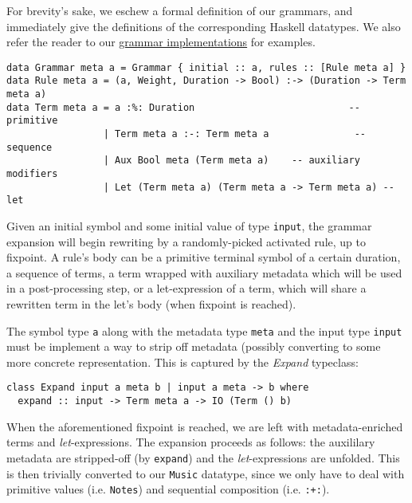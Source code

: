 \documentclass[11pt,a4paper]{article}
\newcommand{\icode}[1]{\texttt{#1}}
\begin{document}
For brevity's sake, we eschew a formal definition of our grammars, and immediately give the definitions of the corresponding Haskell datatypes. We also refer the reader to our \href{https://github.com/omelkonian/AlgoRhythm/blob/master/AlgoRhythm/src/Grammar}{grammar implementations} for examples.
\begin{verbatim}
data Grammar meta a = Grammar { initial :: a, rules :: [Rule meta a] }
data Rule meta a = (a, Weight, Duration -> Bool) :-> (Duration -> Term meta a)
data Term meta a = a :%: Duration                           -- primitive
                 | Term meta a :-: Term meta a               -- sequence
                 | Aux Bool meta (Term meta a)    -- auxiliary modifiers
                 | Let (Term meta a) (Term meta a -> Term meta a) -- let
\end{verbatim}

Given an initial symbol and some initial value of type \icode{input}, the grammar expansion will begin rewriting by a randomly-picked activated rule, up to fixpoint. A rule's body can be a primitive terminal symbol of a certain duration, a sequence of terms, a term wrapped with auxiliary metadata which will be used in a post-processing step, or a let-expression of a term, which will share a rewritten term in the let's body (when fixpoint is reached).

The symbol type \icode{a} along with the metadata type \icode{meta} and the input type \icode{input} must be implement a way to strip off metadata (possibly converting to some more concrete representation. This is captured by the \textit{Expand} typeclass:
\begin{center}\begin{minipage}{0.6\textwidth}\begin{verbatim}
class Expand input a meta b | input a meta -> b where
  expand :: input -> Term meta a -> IO (Term () b)
\end{verbatim}
\end{minipage}
\end{center}

When the aforementioned fixpoint is reached, we are left with metadata-enriched terms and \textit{let}-expressions. The expansion proceeds as follows: the auxililary metadata are stripped-off (by \icode{expand}) and the \textit{let}-expressions are unfolded. This is then trivially converted to our \icode{Music} datatype, since we only have to deal with primitive values (i.e. \icode{Notes}) and sequential composition (i.e. \icode{:+:}).
\end{document}
